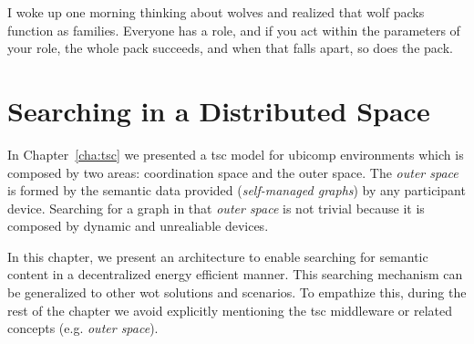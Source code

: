 
\begin{savequote}[50mm]
I woke up one morning thinking about wolves and realized that wolf packs function as families.
Everyone has a role, and if you act within the parameters of your role, the whole pack succeeds, and when that falls apart, so does the pack.
\end{savequote}


\chapter{Searching in a Distributed Space}
\label{cha:searching}


\newcommand{\Space}{\emph{Space}} %
\newcommand{\Spaces}{\emph{Spaces}} %
\newcommand{\consumer}{\emph{Consumer}}
\newcommand{\consumers}{\emph{Consumers}}
\newcommand{\provider}{\emph{Provider}}
\newcommand{\providers}{\emph{Providers}}
\newcommand{\clue}{\emph{clue}}
\newcommand{\clues}{\emph{clues}}


\ifpdf
    \graphicspath{{\pathchapfive/figures/PNG/}{\pathchapfive/figures/PDF/}{\pathchapfive/figures/}}
\else
    \graphicspath{{\pathchapfive/figures/EPS/}{\pathchapfive/figures/}}
\fi



In Chapter~\ref{cha:tsc} we presented a \ac{tsc} model for \ac{ubicomp} environments which is composed by two areas: coordination space and the outer space.
The \emph{outer space} is formed by the semantic data provided (\emph{self-managed graphs}) by any participant device.
Searching for a graph in that \emph{outer space} is not trivial because it is composed by dynamic and unrealiable devices.

In this chapter, we present an architecture to enable searching for semantic content in a decentralized energy efficient manner.
This searching mechanism can be generalized to other \ac{wot} solutions and scenarios.
To empathize this, during the rest of the chapter we avoid explicitly mentioning the \ac{tsc} middleware or related concepts (e.g. \emph{outer space}).

